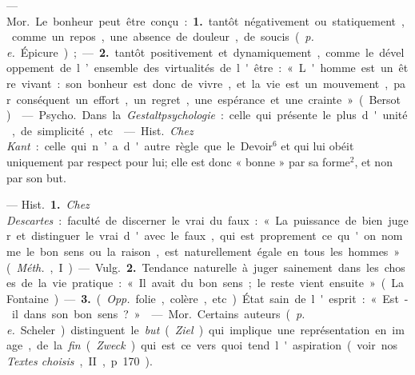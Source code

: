 \begin{itemize}[leftmargin=1cm, label=, itemsep=1pt]
 — \si{Mor.} Le bonheur peut
être conçu : {\bf 1.} tantôt négativement
ou statiquement, comme un repos,
une absence de douleur, de soucis
({\it p. e.} Épicure); — {\bf 2.} tantôt positivement et dynamiquement, comme le
développement de l’ensemble des
virtualités de l'être : « L'homme est
un être vivant : son bonheur est
donc de vivre, et la vie est un mouvement, par conséquent un effort,
un regret, une espérance et une
crainte » (Bersot).

 — \si{Psycho.} Dans la
{\it Gestaltpsychologie} : celle qui présente
le plus d'unité, de simplicité, etc.

 — \si{Hist.} {\it Chez Kant} :
celle qui n’a d'autre règle que le
Devoir$^6$ et qui lui obéit uniquement
par respect pour lui; elle est donc
« bonne » par sa forme$^2$, et non par
son but.

 — \si{Hist.} {\bf 1.} {\it Chez Descartes} :
faculté de discerner le vrai du faux :
« La puissance de bien juger et distinguer le vrai d'avec le faux, qui
est proprement ce qu'on nomme le
bon sens ou la raison, est naturellement égale en tous les hommes »
({\it Méth.}, I).

— \si{Vulg.} {\bf 2.} Tendance naturelle à
juger sainement dans les choses de
la vie pratique : « Il avait du bon
sens; le reste vient ensuite » (La
Fontaine). — {\bf 3.} ({\it Opp.} folie, colère,
etc.). État sain de l'esprit : « Est-il
dans son bon sens ? »

 — \si{Mor.} Certains auteurs ({\it p. e.}
Scheler) distinguent le {\it but} ({\it Ziel}) qui
implique une représentation en
image, de la {\it fin} ({\it Zweck}) qui est ce
vers quoi tend l'aspiration (voir nos
{\it Textes choisis}, II, p. 170).

	\end{itemize}
